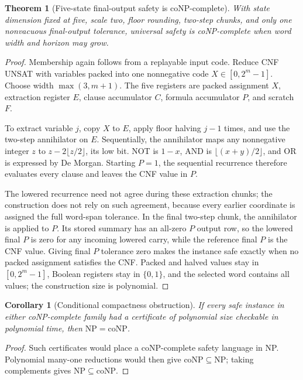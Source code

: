 \documentclass[11pt]{article}
\newtheorem{theorem}[definition]{Theorem}
\newtheorem{corollary}[definition]{Corollary}
\begin{document}
\begin{theorem}[Five-state final-output safety is coNP-complete]\label{thm:five-hard}
With state dimension fixed at five, scale two, floor rounding, two-step chunks, and only one nonvacuous final-output tolerance, universal safety is coNP-complete when word width and horizon may grow.
\end{theorem}
\begin{proof}
Membership again follows from a replayable input code. Reduce CNF UNSAT with variables packed into one nonnegative code $X\in[0,2^m-1]$. Choose width $\max(3,m+1)$. The five registers are packed assignment $X$, extraction register $E$, clause accumulator $C$, formula accumulator $P$, and scratch $F$.

To extract variable $j$, copy $X$ to $E$, apply floor halving $j-1$ times, and use the two-step annihilator on $E$. Sequentially, the annihilator maps any nonnegative integer $z$ to $z-2\lfloor z/2\rfloor$, its low bit. NOT is $1-x$, AND is $\lfloor(x+y)/2\rfloor$, and OR is expressed by De Morgan. Starting $P=1$, the sequential recurrence therefore evaluates every clause and leaves the CNF value in $P$.

The lowered recurrence need not agree during these extraction chunks; the construction does not rely on such agreement, because every earlier coordinate is assigned the full word-span tolerance. In the final two-step chunk, the annihilator is applied to $P$. Its stored summary has an all-zero $P$ output row, so the lowered final $P$ is zero for any incoming lowered carry, while the reference final $P$ is the CNF value. Giving final $P$ tolerance zero makes the instance safe exactly when no packed assignment satisfies the CNF. Packed and halved values stay in $[0,2^m-1]$, Boolean registers stay in $\{0,1\}$, and the selected word contains all values; the construction size is polynomial.
\end{proof}

\begin{corollary}[Conditional compactness obstruction]\label{cor:compact}
If every safe instance in either coNP-complete family had a certificate of polynomial size checkable in polynomial time, then $\mathrm{NP}=\mathrm{coNP}$.
\end{corollary}
\begin{proof}
Such certificates would place a coNP-complete safety language in NP. Polynomial many-one reductions would then give $\mathrm{coNP}\subseteq\mathrm{NP}$; taking complements gives $\mathrm{NP}\subseteq\mathrm{coNP}$.
\end{proof}
\end{document}
